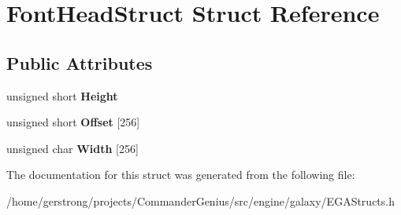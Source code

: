 \hypertarget{struct_font_head_struct}{
\section{FontHeadStruct Struct Reference}
\label{struct_font_head_struct}
}
\subsection*{Public Attributes}
\begin{DoxyCompactItemize}
\item 
\hypertarget{struct_font_head_struct_a861782acfa2052fe31231297b17f9bbc}{
unsigned short {\bfseries Height}}
\label{struct_font_head_struct_a861782acfa2052fe31231297b17f9bbc}

\item 
\hypertarget{struct_font_head_struct_a183766f08b3969142eb15a3ff07970fc}{
unsigned short {\bfseries Offset} \mbox{[}256\mbox{]}}
\label{struct_font_head_struct_a183766f08b3969142eb15a3ff07970fc}

\item 
\hypertarget{struct_font_head_struct_aa95176fe90674367a92ff99345a06f76}{
unsigned char {\bfseries Width} \mbox{[}256\mbox{]}}
\label{struct_font_head_struct_aa95176fe90674367a92ff99345a06f76}

\end{DoxyCompactItemize}


The documentation for this struct was generated from the following file:\begin{DoxyCompactItemize}
\item 
/home/gerstrong/projects/CommanderGenius/src/engine/galaxy/EGAStructs.h\end{DoxyCompactItemize}
